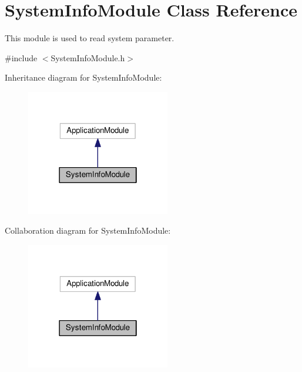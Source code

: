 \hypertarget{classSystemInfoModule}{}\section{System\+Info\+Module Class Reference}
\label{classSystemInfoModule}


This module is used to read system parameter.  




{\ttfamily \#include $<$System\+Info\+Module.\+h$>$}



Inheritance diagram for System\+Info\+Module\+:
\nopagebreak
\begin{figure}[H]
\begin{center}
\leavevmode
\includegraphics[width=178pt]{classSystemInfoModule__inherit__graph}
\end{center}
\end{figure}


Collaboration diagram for System\+Info\+Module\+:
\nopagebreak
\begin{figure}[H]
\begin{center}
\leavevmode
\includegraphics[width=178pt]{classSystemInfoModule__coll__graph}
\end{center}
\end{figure}
